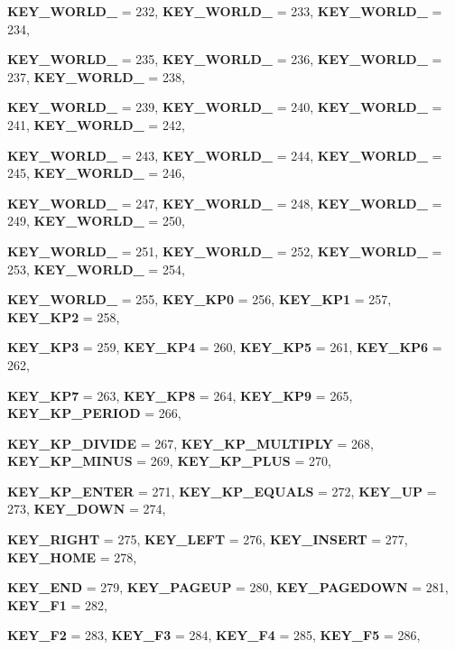 \begin{DoxyCompactItemize}
{\bfseries KEY\_\-WORLD\_} =  232, 
{\bfseries KEY\_\-WORLD\_} =  233, 
{\bfseries KEY\_\-WORLD\_} =  234, 
\par
{\bfseries KEY\_\-WORLD\_} =  235, 
{\bfseries KEY\_\-WORLD\_} =  236, 
{\bfseries KEY\_\-WORLD\_} =  237, 
{\bfseries KEY\_\-WORLD\_} =  238, 
\par
{\bfseries KEY\_\-WORLD\_} =  239, 
{\bfseries KEY\_\-WORLD\_} =  240, 
{\bfseries KEY\_\-WORLD\_} =  241, 
{\bfseries KEY\_\-WORLD\_} =  242, 
\par
{\bfseries KEY\_\-WORLD\_} =  243, 
{\bfseries KEY\_\-WORLD\_} =  244, 
{\bfseries KEY\_\-WORLD\_} =  245, 
{\bfseries KEY\_\-WORLD\_} =  246, 
\par
{\bfseries KEY\_\-WORLD\_} =  247, 
{\bfseries KEY\_\-WORLD\_} =  248, 
{\bfseries KEY\_\-WORLD\_} =  249, 
{\bfseries KEY\_\-WORLD\_} =  250, 
\par
{\bfseries KEY\_\-WORLD\_} =  251, 
{\bfseries KEY\_\-WORLD\_} =  252, 
{\bfseries KEY\_\-WORLD\_} =  253, 
{\bfseries KEY\_\-WORLD\_} =  254, 
\par
{\bfseries KEY\_\-WORLD\_} =  255, 
{\bfseries KEY\_\-KP0} =  256, 
{\bfseries KEY\_\-KP1} =  257, 
{\bfseries KEY\_\-KP2} =  258, 
\par
{\bfseries KEY\_\-KP3} =  259, 
{\bfseries KEY\_\-KP4} =  260, 
{\bfseries KEY\_\-KP5} =  261, 
{\bfseries KEY\_\-KP6} =  262, 
\par
{\bfseries KEY\_\-KP7} =  263, 
{\bfseries KEY\_\-KP8} =  264, 
{\bfseries KEY\_\-KP9} =  265, 
{\bfseries KEY\_\-KP\_\-PERIOD} =  266, 
\par
{\bfseries KEY\_\-KP\_\-DIVIDE} =  267, 
{\bfseries KEY\_\-KP\_\-MULTIPLY} =  268, 
{\bfseries KEY\_\-KP\_\-MINUS} =  269, 
{\bfseries KEY\_\-KP\_\-PLUS} =  270, 
\par
{\bfseries KEY\_\-KP\_\-ENTER} =  271, 
{\bfseries KEY\_\-KP\_\-EQUALS} =  272, 
{\bfseries KEY\_\-UP} =  273, 
{\bfseries KEY\_\-DOWN} =  274, 
\par
{\bfseries KEY\_\-RIGHT} =  275, 
{\bfseries KEY\_\-LEFT} =  276, 
{\bfseries KEY\_\-INSERT} =  277, 
{\bfseries KEY\_\-HOME} =  278, 
\par
{\bfseries KEY\_\-END} =  279, 
{\bfseries KEY\_\-PAGEUP} =  280, 
{\bfseries KEY\_\-PAGEDOWN} =  281, 
{\bfseries KEY\_\-F1} =  282, 
\par
{\bfseries KEY\_\-F2} =  283, 
{\bfseries KEY\_\-F3} =  284, 
{\bfseries KEY\_\-F4} =  285, 
{\bfseries KEY\_\-F5} =  286, 

\end{DoxyCompactItemize}

